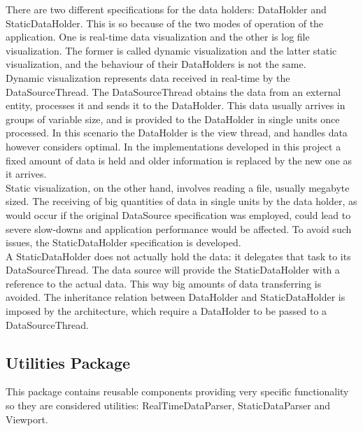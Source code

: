 		There are two different specifications for the data holders: DataHolder and StaticDataHolder. This is so because of the two modes of operation of the application. One is real-time data visualization and the other is log file visualization. The former is called dynamic visualization and the latter static visualization, and the behaviour of their DataHolders is not the same.\\

		Dynamic visualization represents data received in real-time by the DataSourceThread. The DataSourceThread obtains the data from an external entity, processes it and sends it to the DataHolder. This data usually arrives in groups of variable size, and is provided to the DataHolder in single units once processed. In this scenario the DataHolder is the view thread, and handles data however considers optimal. In the implementations developed in this project a fixed amount of data is held and older information is replaced by the new one as it arrives.\\

		Static visualization, on the other hand, involves reading a file, usually megabyte sized. The receiving of big quantities of data in single units by the data holder, as would occur if  the original DataSource specification was employed, could lead to severe slow-downs and application performance would be affected. To avoid such issues, the StaticDataHolder specification is developed.\\

		A StaticDataHolder does not actually hold the data: it delegates that task to its DataSourceThread. The data source will provide the StaticDataHolder with a reference to the actual data. This way big amounts of data transferring is avoided. The inheritance relation between DataHolder and StaticDataHolder is imposed by the architecture, which require a DataHolder to be passed to a DataSourceThread.\\

		\subsection{Utilities Package}

		This package contains reusable components providing very specific functionality so they are considered utilities: RealTimeDataParser, StaticDataParser and Viewport.\\

